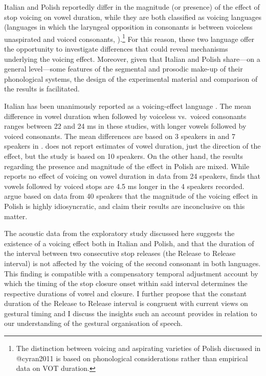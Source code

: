 \documentclass[12pt,]{article}
\let\rmarkdownfootnote\footnote%
\def\footnote{\protect\rmarkdownfootnote}
\begin{document}
Italian and Polish reportedly differ in the magnitude (or presence) of
the effect of stop voicing on vowel duration, while they are both
classified as voicing languages (languages in which the laryngeal
opposition in consonants is between voiceless unaspirated and voiced
consonants,
\citealt{beckman2013}).\footnote{The distinction between voicing and aspirating varieties of Polish discussed in @cyran2011 is based on phonological considerations rather than empirical data on VOT duration.
} For this reason, these two language offer the opportunity to
investigate differences that could reveal mechanisms underlying the
voicing effect. Moreover, given that Italian and Polish share---on a
general level---some features of the segmental and prosodic make-up of
their phonological systems, the design of the experimental material and
comparison of the results is facilitated.

Italian has been unanimously reported as a voicing-effect language
\citep{caldognetto1979, farnetani1986, esposito2002}. The mean
difference in vowel duration when followed by voiceless vs.~voiced
consonants ranges between 22 and 24 ms in these studies, with longer
vowels followed by voiced consonants. The mean differences are based on
3 speakers in \citealt{farnetani1986} and 7 speakers in
\citealt{esposito2002}. \citealt{caldognetto1979} does not report
estimates of vowel duration, just the direction of the effect, but the
study is based on 10 speakers. On the other hand, the results regarding
the presence and magnitude of the effect in Polish are mixed. While
\citet{keating1984} reports no effect of voicing on vowel duration in
data from 24 speakers, \citet{nowak2006} finds that vowels followed by
voiced stops are 4.5 ms longer in the 4 speakers recorded.
\citet{malisz2008} argue based on data from 40 speakers that the
magnitude of the voicing effect in Polish is highly idiosyncratic, and
claim their results are inconclusive on this matter.

The acoustic data from the exploratory study discussed here suggests the
existence of a voicing effect both in Italian and Polish, and that the
duration of the interval between two consecutive stop releases (the
Release to Release interval) is not affected by the voicing of the
second consonant in both languages. This finding is compatible with a
compensatory temporal adjustment account by which the timing of the stop
closure onset within said interval determines the respective durations
of vowel and closure. I further propose that the constant duration of
the Release to Release interval is congruent with current views on
gestural timing \citep{goldstein2014} and I discuss the insights such an
account provides in relation to our understanding of the gestural
organisation of speech.
\end{document}
